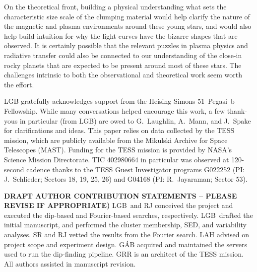 \documentclass[11pt,twocolumn,tighten]{aastex63}
\begin{document}
On the theoretical front,
building a physical understanding what sets the characteristic size
scale of the clumping material would help clarify the nature of
the magnetic and plasma environments around these young stars, 
and would also help build intuition for why the light curves have the
bizarre shapes that are observed.
It is certainly possible that the relevant puzzles in plasma physics
and radiative transfer could also be connected to our
understanding of the close-in rocky planets that are expected to be
present around most of these stars.
The challenges intrinsic to both the observational and theoretical
work seem worth the effort.



\acknowledgments
LGB gratefully acknowledges support from the
Heising-Simons 51~Pegasi~b Fellowship.
While many conversations helped encourage this work,
a few thank-yous in particular (from LGB) 
are owed to G.~Laughlin, A.~Mann, and J.~Spake for clarifications and ideas.
This paper relies on data collected by the TESS mission, which are publicly available from the Mikulski Archive for Space Telescopes (MAST). Funding for the TESS mission is provided by NASA’s Science Mission Directorate.
TIC 402980664 in particular was observed at 120-second cadence thanks to the TESS Guest
Investigator programs G022252 (PI: J.~Schlieder; Sectors 18, 19, 25,
26) and G04168 (PI: R.~Jayaraman; Sector 53).


{\bf DRAFT AUTHOR CONTRIBUTION STATEMENTS -- PLEASE REVISE IF 
	APPROPRIATE)}
LGB~and RJ conceived the project and executed the
dip-based and Fourier-based searches, respectively.
LGB~drafted the initial manuscript, and performed the cluster
membership, SED, and variability analyses.
SR and RJ vetted the results from the Fourier search.
LAH advised on project scope and experiment design.
G\'AB acquired and maintained the servers used to run the dip-finding
pipeline.
GRR is an architect of the TESS mission.
All authors assisted in manuscript revision.

\end{document}

